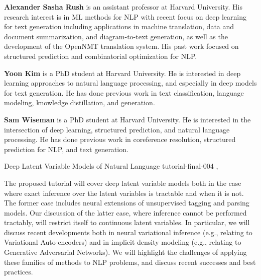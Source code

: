 \begin{bio}

\textbf{Alexander Sasha Rush} is an assistant professor at Harvard University. His research interest is in ML
methods for NLP with recent focus on deep learning for text generation including applications in machine
translation, data and document summarization, and diagram-to-text generation, as well as the development
of the OpenNMT translation system. His past work focused on structured prediction and combinatorial
optimization for NLP.

\textbf{Yoon Kim} is a PhD student at Harvard University. He is interested in deep learning approaches to natural
language processing, and especially in deep models for text generation. He has done previous work in text
classification, language modeling, knowledge distillation, and generation.

\textbf{Sam Wiseman} is a PhD student at Harvard University. He is interested in the intersection of deep learning,
structured prediction, and natural language processing. He has done previous work in coreference
resolution, structured prediction for NLP, and text generation.

\end{bio}

\begin{tutorial}
  {Deep Latent Variable Models of Natural Language}
  {tutorial-final-004}
  {\daydateyear, \tutorialmorningtime}
  {\TutLocD}

The proposed tutorial will cover deep latent variable models both in the case where exact inference over the latent variables is tractable and when it is not. The former case includes neural extensions of unsupervised tagging and parsing models. Our discussion of the latter case, where inference cannot be performed tractably, will restrict itself to continuous latent variables. In particular, we will discuss recent developments both in neural variational inference (e.g., relating to Variational Auto-encoders) and in implicit density modeling (e.g., relating to Generative Adversarial Networks). We will highlight the challenges of applying these families of methods to NLP problems, and discuss recent successes and best practices.

\end{tutorial}
